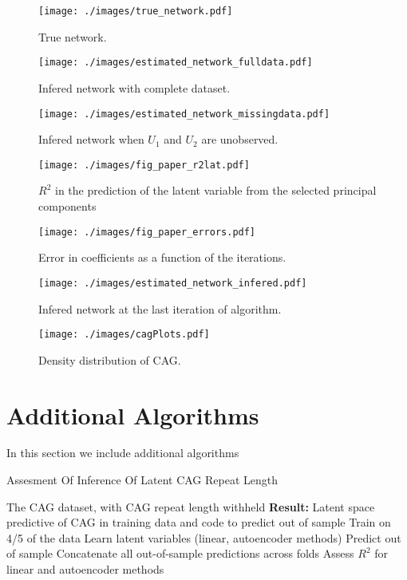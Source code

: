 \documentclass[letterpaper]{article}
\begin{document}
\begin{figure}[ht!]
  \centering
  \texttt{[image: ./images/true\_network.pdf]}
      \caption{\label{fig_network_true}True network. }
\end{figure}
\begin{figure}[ht!]
  \centering
  \texttt{[image: ./images/estimated\_network\_fulldata.pdf]}
      \caption{\label{fig_network_full}Infered network with complete dataset. }
\end{figure}

\begin{figure}[ht!]
  \centering
  \texttt{[image: ./images/estimated\_network\_missingdata.pdf]}
      \caption{\label{fig_network_miss}Infered network when $U_1$ and
      $U_2$ are unobserved. }
\end{figure}


\begin{figure}[ht!]
  \centering
  \texttt{[image: ./images/fig\_paper\_r2lat.pdf]}
      \caption{\label{fig_latvar_r2} $R^2$ in the prediction of the latent variable from the selected principal components}
\end{figure}

\begin{figure}[ht!]
  \centering
  \texttt{[image: ./images/fig\_paper\_errors.pdf]}
      \caption{\label{fig_coef_rmse} Error in coefficients as a function of the iterations.}
\end{figure}


\begin{figure}[ht!]
  \centering
  \texttt{[image: ./images/estimated\_network\_infered.pdf]}
      \caption{\label{fig_network_learn}Infered network at the last
      iteration of algorithm. }
\end{figure}

\begin{figure}[ht!]
  \centering
  \texttt{[image: ./images/cagPlots.pdf]}
      \caption{\label{fig_cag_density} Density distribution of CAG. }
\end{figure}

\clearpage
\section{Additional Algorithms}
In this section we include additional algorithms

\begin{algorithm}%
 \caption{Assesment Of Inference Of Latent CAG Repeat Length}
 \label{alg_cag}
\begin{algorithmic}
 The CAG dataset, with CAG repeat length withheld
\State \textbf{Result:} Latent space predictive of CAG in training data and code to predict out of sample
  \State Train on 4/5 of the data
  \State Learn latent variables (linear, autoencoder methods)
  \State Predict out of sample
 \EndFor
 \State Concatenate all out-of-sample predictions across folds
 \State Assess $R^{2}$ for linear and autoencoder methods
\end{algorithmic}
\end{algorithm}
\end{document}
